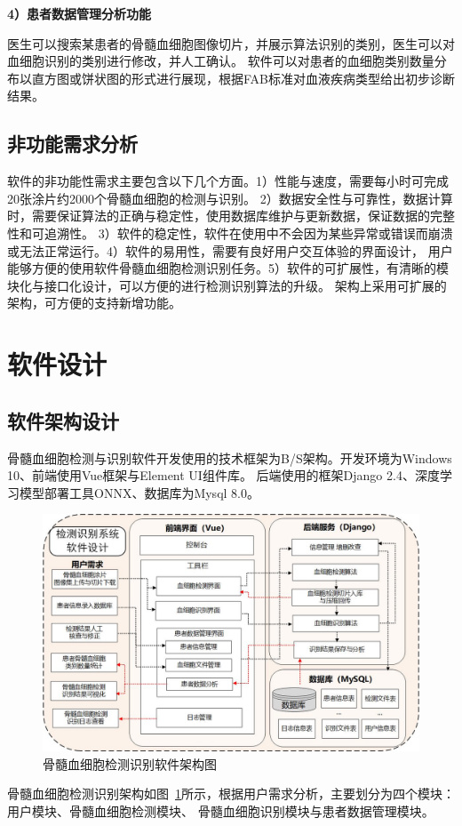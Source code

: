 \textbf{4）患者数据管理分析功能}

医生可以搜索某患者的骨髓血细胞图像切片，并展示算法识别的类别，医生可以对血细胞识别的类别进行修改，并人工确认。
软件可以对患者的血细胞类别数量分布以直方图或饼状图的形式进行展现，根据FAB标准对血液疾病类型给出初步诊断结果。

\subsection{非功能需求分析}
软件的非功能性需求主要包含以下几个方面。1）性能与速度，需要每小时可完成20张涂片约2000个骨髓血细胞的检测与识别。
2）数据安全性与可靠性，数据计算时，需要保证算法的正确与稳定性，使用数据库维护与更新数据，保证数据的完整性和可追溯性。
3）软件的稳定性，软件在使用中不会因为某些异常或错误而崩溃或无法正常运行。4）软件的易用性，需要有良好用户交互体验的界面设计，
用户能够方便的使用软件骨髓血细胞检测识别任务。5）软件的可扩展性，有清晰的模块化与接口化设计，可以方便的进行检测识别算法的升级。
架构上采用可扩展的架构，可方便的支持新增功能。

\section{软件设计}

\subsection{软件架构设计}
骨髓血细胞检测与识别软件开发使用的技术框架为B/S架构。开发环境为Windows 10、前端使用Vue框架与Element UI组件库。
后端使用的框架Django 2.4、深度学习模型部署工具ONNX、数据库为Mysql 8.0。

\begin{figure}[htbp]                     
  \centering                      
  \includegraphics[width=0.99\linewidth]{software_structure.jpg}                      
  \caption{骨髓血细胞检测识别软件架构图}                      
  \label{fig:software}       
\end{figure}
骨髓血细胞检测识别架构如图~\ref{fig:software}所示，根据用户需求分析，主要划分为四个模块：用户模块、骨髓血细胞检测模块、
骨髓血细胞识别模块与患者数据管理模块。

